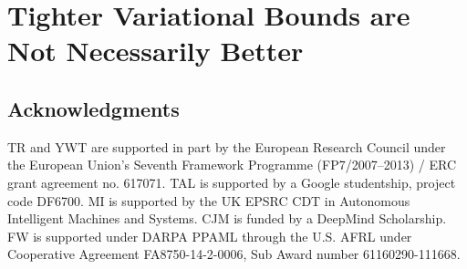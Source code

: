 \chapter{Tighter Variational Bounds are Not Necessarily Better}





\begin{abstract}
\vspace{2pt}
We provide theoretical and empirical evidence that using tighter \glspl{ELBO}
can be
detrimental to the process of learning an inference network by reducing the 
signal-to-noise ratio of the gradient estimator.  Our results call into question common 
implicit assumptions that tighter \glspl{ELBO} are better variational objectives for 
simultaneous model learning and inference amortization schemes.
Based on our insights, we introduce three new algorithms:  the partially importance
weighted auto-encoder (\textsc{piwae}), the multiply
importance weighted auto-encoder (\textsc{miwae}), and the combination importance weighted
auto-encoder (\textsc{ciwae}), each of which includes the standard importance
weighted auto-encoder (\textsc{iwae}) as a special case.  We show that each
can deliver improvements over \textsc{iwae}, even when performance is measured
by the \textsc{iwae} target itself. Furthermore, our results suggest that \textsc{piwae} 
may be able to deliver simultaneous improvements in the training of both
the inference and generative networks.
\end{abstract}









\section*{Acknowledgments}

TR and YWT are supported in part by the European Research Council under the European Union's Seventh Framework Programme (FP7/2007--2013) / ERC grant agreement no. 617071. 
TAL is supported by a Google studentship, project code DF6700.
MI is supported by the UK EPSRC CDT in Autonomous Intelligent Machines
and Systems.
CJM is funded by a DeepMind Scholarship.
FW is supported under DARPA PPAML through the U.S. AFRL
under Cooperative Agreement FA8750-14-2-0006, Sub Award number 61160290-111668.


\begin{subappendices}
	
	
	
	
	
\end{subappendices}

